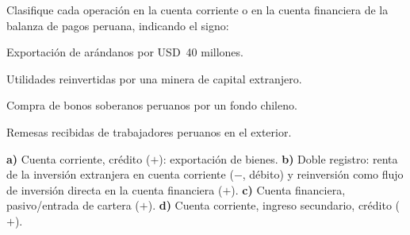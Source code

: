 \documentclass[soluciones]{evaluacion}
\begin{document}
\begin{pregunta}
Clasifique cada operación en la cuenta corriente o en la cuenta
financiera de la balanza de pagos peruana, indicando el signo:
\begin{apartados}
  \item Exportación de arándanos por USD~40 millones.
  \item Utilidades reinvertidas por una minera de capital extranjero.
  \item Compra de bonos soberanos peruanos por un fondo chileno.
  \item Remesas recibidas de trabajadores peruanos en el exterior.
\end{apartados}
\begin{solucion}
\textbf{a)} Cuenta corriente, crédito ($+$): exportación de bienes.
\textbf{b)} Doble registro: renta de la inversión extranjera en cuenta
corriente ($-$, débito) y reinversión como flujo de inversión directa en
la cuenta financiera ($+$).
\textbf{c)} Cuenta financiera, pasivo/entrada de cartera ($+$).
\textbf{d)} Cuenta corriente, ingreso secundario, crédito ($+$).
\end{solucion}
\end{pregunta}
\end{document}
